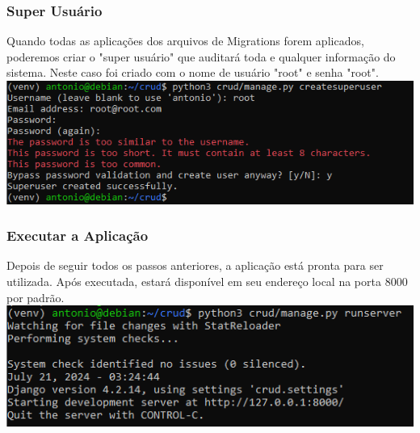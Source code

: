 \documentclass[11pt]{article} %
\begin{document}
\subsubsection{Super Usuário}
Quando todas as aplicações dos arquivos de Migrations forem aplicados, poderemos criar o "super usuário" que auditará toda e qualquer informação do sistema. Neste caso foi criado com o nome de usuário "root" e senha "root".\\
\includegraphics[]{images/s7.PNG}
\subsubsection{Executar a Aplicação}
Depois de seguir todos os passos anteriores, a aplicação está pronta para ser utilizada. Após executada, estará disponível em seu endereço local na porta 8000 por padrão.\\
\includegraphics[]{images/s8.PNG}


\maketitle
\end{document}
